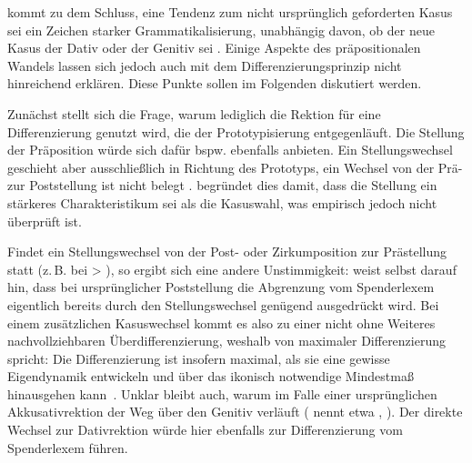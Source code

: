 \citet[348]{DiMeola1999} kommt zu dem Schluss, eine Tendenz zum nicht ursprünglich geforderten Kasus sei ein Zeichen starker Grammatikalisierung, unabhängig davon, ob der neue Kasus der Dativ oder der Genitiv sei \parencites[s. auch][162]{DiMeola2000}[220]{DiMeola2003}. 
Einige Aspekte des präpositionalen Wandels lassen sich jedoch auch mit dem Differenzierungsprinzip nicht hinreichend erklären. 
Diese Punkte sollen im Folgenden diskutiert werden. 

Zunächst stellt sich die Frage, warum lediglich die Rektion für eine Differenzierung genutzt wird, die der Prototypisierung entgegenläuft. 
Die Stellung der Präposition würde sich dafür bspw. ebenfalls anbieten. 
Ein Stellungswechsel geschieht aber ausschließlich in Richtung des Prototyps, ein Wechsel von der Prä- zur Poststellung ist nicht belegt \citep[s.][163]{DiMeola2000}. 
\citet[163]{DiMeola2000} begründet dies damit, dass die Stellung ein stärkeres Charakteristikum sei als die Kasuswahl, was empirisch jedoch nicht überprüft ist.

Findet ein Stellungswechsel von der Post- oder Zirkumposition zur Prästellung statt (z.\,B. bei  > ), so ergibt sich eine andere Unstimmigkeit:
\citet[144]{DiMeola2000} weist selbst darauf hin, dass bei urspr{\"u}nglicher Poststellung die Abgrenzung vom Spenderlexem eigentlich bereits durch den Stellungswechsel gen{\"u}gend ausgedr{\"u}ckt wird. 
Bei einem zusätzlichen Kasuswechsel kommt es also zu einer nicht ohne Weiteres nachvollziehbaren Überdifferenzierung, weshalb \citet{DiMeola2000} von \glqq maximaler Differenzierung\grqq{} spricht: 
\glqq Die Differenzierung ist insofern {\glq}maximal{\grq}, als sie eine gewisse Eigendynamik entwickeln und {\"u}ber das ikonisch {\glq}notwendige{\grq} Mindestma{\ss} hinausgehen kann\grqq{}~\citep[144]{DiMeola2000}. 
Unklar bleibt auch, warum im Falle einer urspr{\"u}nglichen Akkusativrektion der Weg {\"u}ber den Genitiv verl{\"a}uft (\citealp[][421]{DiMeola2006} nennt etwa , \citealp[vgl. auch][214]{DiMeola2009}). 
Der direkte Wechsel zur Dativrektion w{\"u}rde hier ebenfalls zur Differenzierung vom Spenderlexem f{\"u}hren. 

